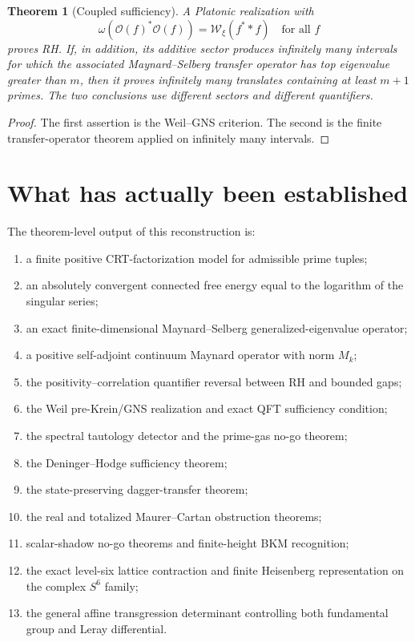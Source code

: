 \documentclass[11pt]{article}
\newtheorem{theorem}{Theorem}[section]
\theoremstyle{definition}
\theoremstyle{remark}
\newcommand{\WW}{\mathcal W}
\newcommand{\1}{\mathbf 1}
\begin{document}
\begin{theorem}[Coupled sufficiency]
A Platonic realization with
\[
\omega(\mathcal O(f)^*\mathcal O(f))=\WW_\xi(f^**f)
\quad\text{for all }f
\]
proves RH.  If, in addition, its additive sector produces infinitely many intervals for which the associated Maynard--Selberg transfer operator has top eigenvalue greater than $m$, then it proves infinitely many translates containing at least $m+1$ primes.  The two conclusions use different sectors and different quantifiers.
\end{theorem}

\begin{proof}
The first assertion is the Weil--GNS criterion.  The second is the finite transfer-operator theorem applied on infinitely many intervals.
\end{proof}

\section{What has actually been established}

The theorem-level output of this reconstruction is:
\begin{enumerate}[label=(R\arabic*)]
\item a finite positive CRT-factorization model for admissible prime tuples;
\item an absolutely convergent connected free energy equal to the logarithm of the singular series;
\item an exact finite-dimensional Maynard--Selberg generalized-eigenvalue operator;
\item a positive self-adjoint continuum Maynard operator with norm $M_k$;
\item the positivity--correlation quantifier reversal between RH and bounded gaps;
\item the Weil pre-Krein/GNS realization and exact QFT sufficiency condition;
\item the spectral tautology detector and the prime-gas no-go theorem;
\item the Deninger--Hodge sufficiency theorem;
\item the state-preserving dagger-transfer theorem;
\item the real and totalized Maurer--Cartan obstruction theorems;
\item scalar-shadow no-go theorems and finite-height BKM recognition;
\item the exact level-six lattice contraction and finite Heisenberg representation on the complex $S^6$ family;
\item the general affine transgression determinant controlling both fundamental group and Leray differential.
\end{enumerate}
\end{document}
